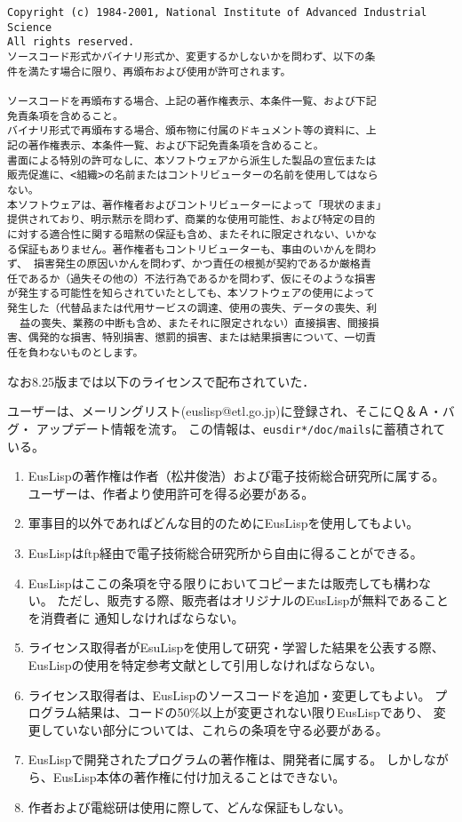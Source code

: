 \begin{verbatim}
Copyright (c) 1984-2001, National Institute of Advanced Industrial Science
All rights reserved.
ソースコード形式かバイナリ形式か、変更するかしないかを問わず、以下の条
件を満たす場合に限り、再頒布および使用が許可されます。

ソースコードを再頒布する場合、上記の著作権表示、本条件一覧、および下記
免責条項を含めること。
バイナリ形式で再頒布する場合、頒布物に付属のドキュメント等の資料に、上
記の著作権表示、本条件一覧、および下記免責条項を含めること。
書面による特別の許可なしに、本ソフトウェアから派生した製品の宣伝または
販売促進に、<組織>の名前またはコントリビューターの名前を使用してはなら
ない。
本ソフトウェアは、著作権者およびコントリビューターによって「現状のまま」
提供されており、明示黙示を問わず、商業的な使用可能性、および特定の目的
に対する適合性に関する暗黙の保証も含め、またそれに限定されない、いかな
る保証もありません。著作権者もコントリビューターも、事由のいかんを問わ
ず、 損害発生の原因いかんを問わず、かつ責任の根拠が契約であるか厳格責
任であるか（過失その他の）不法行為であるかを問わず、仮にそのような損害
が発生する可能性を知らされていたとしても、本ソフトウェアの使用によって
発生した（代替品または代用サービスの調達、使用の喪失、データの喪失、利
  益の喪失、業務の中断も含め、またそれに限定されない）直接損害、間接損
害、偶発的な損害、特別損害、懲罰的損害、または結果損害について、一切責
任を負わないものとします。
\end{verbatim}

なお8.25版までは以下のライセンスで配布されていた．

ユーザーは、メーリングリスト(euslisp@etl.go.jp)に登録され、そこにＱ＆Ａ・バグ・
アップデート情報を流す。
この情報は、{\tt *eusdir*/doc/mails}に蓄積されている。

\begin{enumerate}
\item EusLispの著作権は作者（松井俊浩）および電子技術総合研究所に属する。
ユーザーは、作者より使用許可を得る必要がある。
\item 軍事目的以外であればどんな目的のためにEusLispを使用してもよい。
\item EusLispはftp経由で電子技術総合研究所から自由に得ることができる。
\item EusLispはここの条項を守る限りにおいてコピーまたは販売しても構わない。
ただし、販売する際、販売者はオリジナルのEusLispが無料であることを消費者に
通知しなければならない。
\item ライセンス取得者がEsuLispを使用して研究・学習した結果を公表する際、
EusLispの使用を特定参考文献として引用しなければならない。
\item ライセンス取得者は、EusLispのソースコードを追加・変更してもよい。
プログラム結果は、コードの50\%以上が変更されない限りEusLispであり、
変更していない部分については、これらの条項を守る必要がある。
\item EusLispで開発されたプログラムの著作権は、開発者に属する。
しかしながら、EusLisp本体の著作権に付け加えることはできない。
\item 作者および電総研は使用に際して、どんな保証もしない。
\end{enumerate}

